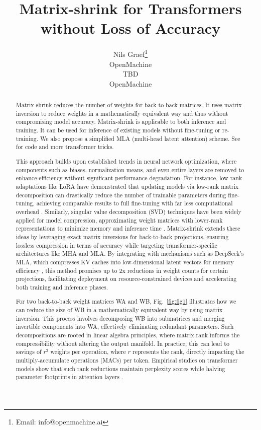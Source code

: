 \documentclass{article}
\title{Matrix-shrink for Transformers without Loss of Accuracy}
\author{
  Nils Graef\thanks{Email: info@openmachine.ai} \\
  OpenMachine \\
  \And
  TBD \\
  OpenMachine
}
\begin{document}
\maketitle

\begin{abstract}
Matrix-shrink reduces the number of weights for back-to-back matrices. It uses matrix inversion to reduce weights in a mathematically equivalent way and thus without compromising model accuracy. Matrix-shrink is applicable to both inference and training. It can be used for inference of existing models without fine-tuning or re-training. We also propose a simplified MLA (multi-head latent attention) scheme. See \cite{openmachine2024} for code and more transformer tricks.

This approach builds upon established trends in neural network optimization, where components such as biases, normalization means, and even entire layers are removed to enhance efficiency without significant performance degradation. For instance, low-rank adaptations like LoRA have demonstrated that updating models via low-rank matrix decomposition can drastically reduce the number of trainable parameters during fine-tuning, achieving comparable results to full fine-tuning with far less computational overhead \cite{medium2025lora}. Similarly, singular value decomposition (SVD) techniques have been widely applied for model compression, approximating weight matrices with lower-rank representations to minimize memory and inference time \cite{lesswrong2022svd}. Matrix-shrink extends these ideas by leveraging exact matrix inversions for back-to-back projections, ensuring lossless compression in terms of accuracy while targeting transformer-specific architectures like MHA and MLA. By integrating with mechanisms such as DeepSeek's MLA, which compresses KV caches into low-dimensional latent vectors for memory efficiency \cite{deepseek2024}, this method promises up to 2x reductions in weight counts for certain projections, facilitating deployment on resource-constrained devices and accelerating both training and inference phases.

For two back-to-back weight matrices WA and WB, Fig.~\ref{fig:fig1} illustrates how we can reduce the size of WB in a mathematically equivalent way by using matrix inversion. This process involves decomposing WB into submatrices and merging invertible components into WA, effectively eliminating redundant parameters. Such decompositions are rooted in linear algebra principles, where matrix rank informs the compressibility without altering the output manifold. In practice, this can lead to savings of $r^{2}$ weights per operation, where $r$ represents the rank, directly impacting the multiply-accumulate operations (MACs) per token. Empirical studies on transformer models show that such rank reductions maintain perplexity scores while halving parameter footprints in attention layers \cite{arxiv2024feature}.
\end{abstract}
\end{document}
